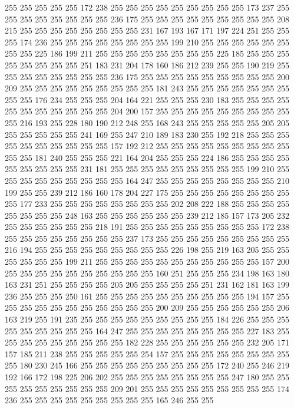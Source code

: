 255 255 255 255 255 172 238 255 255 255 255 255 255 255 255 255 173 237 255 255
255 255 255 255 255 255 236 175 255 255 255 255 255 255 255 255 255 208 215 255
255 255 255 255 255 255 255 231 167 193 167 171 197 224 251 255 255 255 174 236
255 255 255 255 255 255 255 255 199 210 255 255 255 255 255 255 255 255 225 186
199 211 255 255 255 255 255 255 255 255 225 185 255 255 255 255 255 255 255 255
251 183 231 204 178 160 186 212 239 255 255 190 219 255 255 255 255 255 255 255
255 236 175 255 255 255 255 255 255 255 255 255 200 209 255 255 255 255 255 255
255 255 255 181 243 255 255 255 255 255 255 255 255 255 176 234 255 255 255 204
164 221 255 255 255 230 183 255 255 255 255 255 255 255 255 255 255 255 204 200
157 255 255 255 255 255 255 255 255 255 255 216 193 255 228 180 190 212 248 255
168 243 255 255 255 255 255 205 205 255 255 255 255 255 241 169 255 247 210 189
183 230 255 192 218 255 255 255 255 255 255 255 255 255 255 157 192 212 255 255
255 255 255 255 255 255 255 255 255 181 240 255 255 255 221 164 204 255 255 255
224 186 255 255 255 255 255 255 255 255 255 231 181 255 255 255 255 255 255 255
255 255 199 210 255 255 255 255 255 255 255 255 255 164 247 255 255 255 255 255
255 255 255 210 199 255 255 239 212 186 160 178 204 227 175 255 255 255 255 255
255 255 255 255 177 233 255 255 255 255 255 255 255 255 202 208 222 188 255 255
255 255 255 255 255 255 248 163 255 255 255 255 255 255 239 212 185 157 173 205
232 255 255 255 255 255 255 218 191 255 255 255 255 255 255 255 255 255 172 238
255 255 255 255 255 255 255 255 237 173 255 255 255 255 255 255 255 255 255 216
194 255 255 255 255 255 255 255 255 255 226 198 255 219 163 205 255 255 255 255
255 255 199 211 255 255 255 255 255 255 255 255 255 255 255 157 200 255 255 255
255 255 255 255 255 255 255 160 251 255 255 255 234 198 163 180 163 231 251 255
255 255 255 205 205 255 255 255 255 251 231 162 181 163 199 236 255 255 255 250
161 255 255 255 255 255 255 255 255 255 255 194 157 255 255 255 255 255 255 255
255 255 255 255 200 209 255 255 255 255 255 255 206 163 219 255 191 235 255 255
255 255 255 255 255 255 255 184 226 255 255 255 255 255 255 255 255 255 164 247
255 255 255 255 255 255 255 255 227 183 255 255 255 255 255 255 255 255 255 182
228 255 255 255 255 255 255 232 205 171 157 185 211 238 255 255 255 255 255 254
157 255 255 255 255 255 255 255 255 255 180 230 245 166 255 255 255 255 255 255
255 255 255 172 240 255 246 219 192 166 172 198 225 206 202 255 255 255 255 255
255 255 255 247 180 255 255 255 255 255 255 255 255 255 209 201 255 255 255 255
255 255 255 255 255 174 236 255 255 255 255 255 255 255 255 255 165 246 255 255
